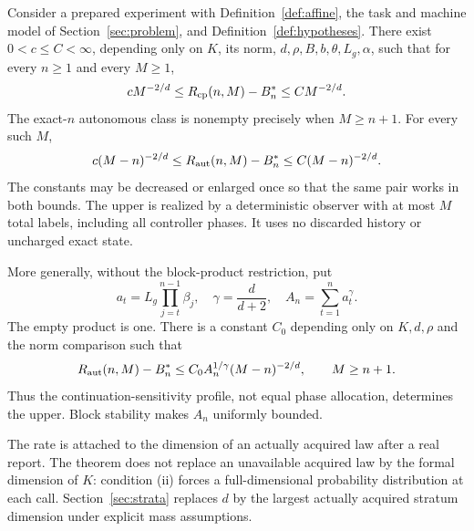 \begin{theorem}\label{thm:main}
Consider a prepared experiment with Definition~\ref{def:affine}, the task and machine model of Section~\ref{sec:problem}, and Definition~\ref{def:hypotheses}. There exist $0<c\le C<\infty$, depending only on $K$, its norm, $d,\rho,B,b,\theta,L_g,\alpha$, such that for every $n\ge1$ and every $M\ge1$,
\begin{equation}\label{eq:maincp}
 cM^{-2/d}\le R_{\mathrm{cp}}(n,M)-B_n^*\le CM^{-2/d}.
\end{equation}
The exact-$n$ autonomous class is nonempty precisely when $M\ge n+1$. For every such $M$,
\begin{equation}\label{eq:mainaut}
 c(M-n)^{-2/d}\le R_{\mathrm{aut}}(n,M)-B_n^*\le C(M-n)^{-2/d}.
\end{equation}
The constants may be decreased or enlarged once so that the same pair works in both bounds. The upper is realized by a deterministic observer with at most $M$ total labels, including all controller phases. It uses no discarded history or uncharged exact state.

More generally, without the block-product restriction, put
\begin{equation}\label{eq:weights}
 a_t=L_g\prod_{j=t}^{n-1}\beta_j,\quad
 \gamma=\frac{d}{d+2},\quad A_n=\sum_{t=1}^n a_t^\gamma.
\end{equation}
The empty product is one. There is a constant $C_0$ depending only on $K,d,\rho$ and the norm comparison such that
\begin{equation}\label{eq:weighted}
 R_{\mathrm{aut}}(n,M)-B_n^*\le C_0 A_n^{1/\gamma}(M-n)^{-2/d},\qquad M\ge n+1.
\end{equation}
Thus the continuation-sensitivity profile, not equal phase allocation, determines the upper. Block stability makes $A_n$ uniformly bounded.
\end{theorem}

The rate is attached to the dimension of an actually acquired law after a real report. The theorem does not replace an unavailable acquired law by the formal dimension of $K$: condition (ii) forces a full-dimensional probability distribution at each call. Section~\ref{sec:strata} replaces $d$ by the largest actually acquired stratum dimension under explicit mass assumptions.

